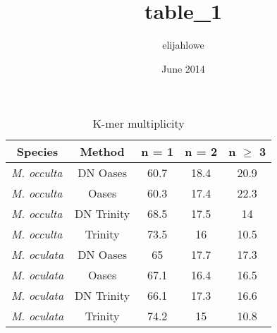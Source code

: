 \documentclass{article}
\title{table_1}
\author{elijahlowe }
\date{June 2014}
\begin{document}
\begin{table}[ht]
\renewcommand\thetable{3}
\caption{K-mer multiplicity}
\centering
\begin{tabular}{l c c c c}
\hline\hline
\multicolumn{1}{c}{Species} & Method & n = 1 &n = 2 & n $\geq$ 3 \\ [0.5ex] %
\hline
\textit{M. occulta} &DN Oases& 60.7&18.4&20.9\\
\textit{M. occulta} &Oases& 60.3 &17.4&22.3\\
\textit{M. occulta} &DN Trinity& 68.5&17.5&14\\
\textit{M. occulta} &Trinity&73.5&16&10.5\\
\textit{M. oculata} &DN Oases&65 &17.7&17.3\\
\textit{M. oculata} &Oases& 67.1 &16.4&16.5\\
\textit{M. oculata} &DN Trinity& 66.1 &17.3&16.6\\
\textit{M. oculata} &Trinity& 74.2 &15&10.8\\ [1ex]
\hline
\end{tabular}
\label{table:nonlin}
\end{table}
\end{document}
